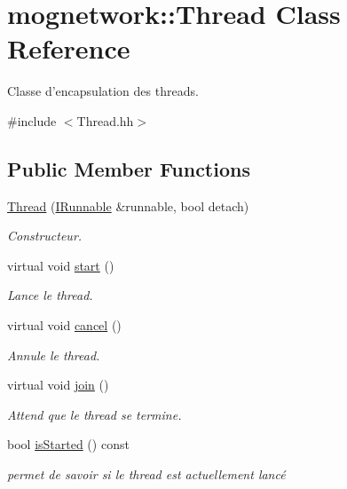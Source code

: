 \hypertarget{classmognetwork_1_1_thread}{\section{mognetwork\-:\-:Thread Class Reference}
\label{classmognetwork_1_1_thread}
}


Classe d'encapsulation des threads.  




{\ttfamily \#include $<$Thread.\-hh$>$}

\subsection*{Public Member Functions}
\begin{DoxyCompactItemize}
\item 
\hyperlink{classmognetwork_1_1_thread_af62df267bb08a768111b98e46b9d8675}{Thread} (\hyperlink{classmognetwork_1_1_i_runnable}{I\-Runnable} \&runnable, bool detach)
\begin{DoxyCompactList}\small\item\em Constructeur. \end{DoxyCompactList}\item 
\hypertarget{classmognetwork_1_1_thread_af50e944ca134178706495a3448a263fc}{virtual void \hyperlink{classmognetwork_1_1_thread_af50e944ca134178706495a3448a263fc}{start} ()}\label{classmognetwork_1_1_thread_af50e944ca134178706495a3448a263fc}

\begin{DoxyCompactList}\small\item\em Lance le thread. \end{DoxyCompactList}\item 
\hypertarget{classmognetwork_1_1_thread_a62e7929cde1edc54df6e4a32bc6dac15}{virtual void \hyperlink{classmognetwork_1_1_thread_a62e7929cde1edc54df6e4a32bc6dac15}{cancel} ()}\label{classmognetwork_1_1_thread_a62e7929cde1edc54df6e4a32bc6dac15}

\begin{DoxyCompactList}\small\item\em Annule le thread. \end{DoxyCompactList}\item 
\hypertarget{classmognetwork_1_1_thread_adc557095ab8d062aad0cbd91e5c5e6ea}{virtual void \hyperlink{classmognetwork_1_1_thread_adc557095ab8d062aad0cbd91e5c5e6ea}{join} ()}\label{classmognetwork_1_1_thread_adc557095ab8d062aad0cbd91e5c5e6ea}

\begin{DoxyCompactList}\small\item\em Attend que le thread se termine. \end{DoxyCompactList}\item 
bool \hyperlink{classmognetwork_1_1_thread_ac980f839f427ef11c0ae74ba5bec9c24}{is\-Started} () const 
\begin{DoxyCompactList}\small\item\em permet de savoir si le thread est actuellement lancé \end{DoxyCompactList}\end{DoxyCompactItemize}

